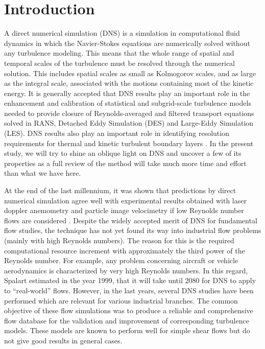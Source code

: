 \documentclass[12pt,oneside,a4paper,english]{article}
\begin{document}
\section{Introduction}
A direct numerical simulation (DNS) is a simulation in computational fluid dynamics in which the Navier-Stokes equations are numerically solved without any turbulence modeling. This means that the whole range of spatial and temporal scales of the turbulence must be resolved through the numerical solution. This includes spatial scales as small as Kolmogorov scales, and as large as the integral scale, associated with the motions containing most of the kinetic energy. It is generally accepted that DNS results play an important role in the enhancement and calibration of statistical and subgrid-scale turbulence models needed to provide closure of Reynolds-averaged and filtered transport equations solved in RANS, Detached Eddy Simulation (DES) and Large-Eddy Simulation (LES). DNS results also play an important role in identifying resolution requirements for thermal and kinetic turbulent boundary layers \cite{wagner2011}. In the present study, we will try to shine an oblique light on DNS and uncover a few of its properties as a full review of the method will take much more time and effort than what we have here.

At the end of the last millennium, it was shown that predictions by direct numerical simulation agree well with experimental results obtained with laser doppler anemometry and particle image velocimetry if low Reynolds number flows are considered \cite{eggels_unger_weiss_westerweel_adrian_friedrich_nieuwstadt_1994}. Despite the widely accepted merit of DNS for fundamental flow studies, the technique has not yet found its way into industrial flow problems (mainly with high Reynolds numbers). The reason for this is the required computational resource increment with approximately the third power of the Reynolds number. For example, any problem concerning aircraft or vehicle aerodynamics is characterized by very high Reynolds numbers. In this regard, Spalart \cite{SPALART2000252} estimated in the year 1999, that it will take until 2080 for DNS to apply to ``real-world'' flows. However, in the last years, several DNS studies have been performed which are relevant for various industrial branches. The common objective of these flow simulations was to produce a reliable and comprehensive flow database for the validation and improvement of corresponding turbulence models. These models are known to perform well for simple shear flows but do not give good results in general cases.
\end{document}
